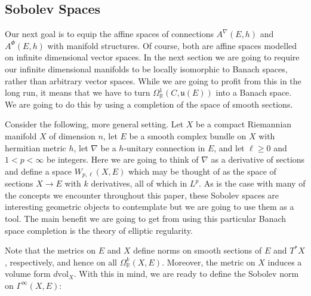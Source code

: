 \documentclass[12pt]{ociamthesis}  %
\begin{document}
\subsection{Sobolev Spaces}

Our next goal is to equip the affine spaces of connections $A^\nabla(E,h)$
and $A^\Phi (E,h)$ with manifold structures. Of course, both are affine
spaces modelled on infinite dimensional vector spaces. In the next
section we are going to require our infinite dimensional manifolds to
be locally isomorphic to Banach spaces, rather than arbitrary
vector spaces. While we are going to profit from this in the long run,
it means that we have to turn $\Omega^1_{\mathbb{R}}(C,\mathfrak u(E))$
into a Banach space. We are going to do this by using a completion of
the space of smooth sections.

Consider the following, more general setting. Let $X$ be a compact
Riemannian manifold $X$ of dimension $n$, let $E$ be a smooth complex
bundle on $X$ with hermitian metric $h$, let $\nabla$ be a $h$-unitary
connection in $E$, and let $\ell\geq 0$ and $1<p<\infty$ be integers.
Here we are going to think of $\nabla$ as a derivative of sections and
define a space $W_{p,\ell}(X,E)$ which may be thought of as the space of
sections $X\to E$ with $k$ derivatives, all of which in $L^p$. As
is the case with many of the concepts we encounter throughout this paper,
these Sobolev spaces are interesting geometric objects to
contemplate but we are going to use them as a tool. The main
benefit we are going to get from using this particular Banach space
completion is the theory of elliptic regularity. \missingcitation

Note that the metrics on $E$ and $X$ define norms on smooth sections
of $E$ and $T^*X$, respectively, and hence on all
$\Omega^k_{\mathbb{R}}(X,E)$.
Moreover, the metric on $X$ induces a volume form $d\text{vol}_X$.
With this in mind, we are ready to define the Sobolev norm on
$\Gamma^\infty(X,E)$:
\end{document}
